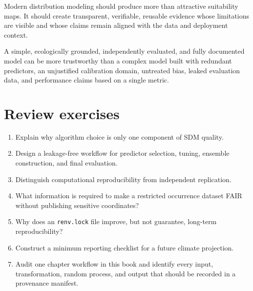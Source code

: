 Modern distribution modeling should produce more than attractive suitability maps. It should create transparent, verifiable, reusable evidence whose limitations are visible and whose claims remain aligned with the data and deployment context.

\begin{sdmkeybox}
A simple, ecologically grounded, independently evaluated, and fully documented model can be more trustworthy than a complex model built with redundant predictors, an unjustified calibration domain, untreated bias, leaked evaluation data, and performance claims based on a single metric.
\end{sdmkeybox}

\section{Review exercises}

\begin{enumerate}
\item Explain why algorithm choice is only one component of SDM quality.
\item Design a leakage-free workflow for predictor selection, tuning, ensemble construction, and final evaluation.
\item Distinguish computational reproducibility from independent replication.
\item What information is required to make a restricted occurrence dataset FAIR without publishing sensitive coordinates?
\item Why does an \texttt{renv.lock} file improve, but not guarantee, long-term reproducibility?
\item Construct a minimum reporting checklist for a future climate projection.
\item Audit one chapter workflow in this book and identify every input, transformation, random process, and output that should be recorded in a provenance manifest.
\end{enumerate}
